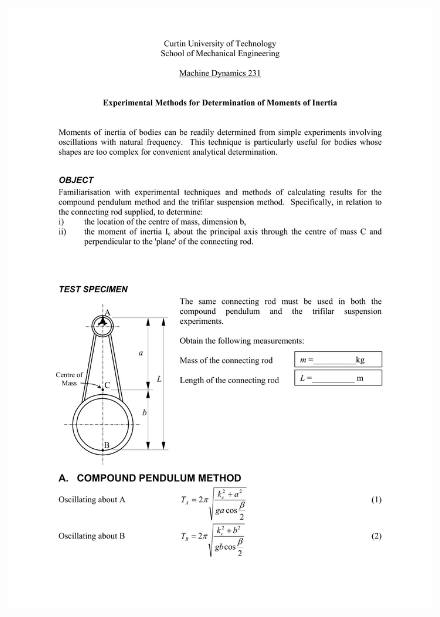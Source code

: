 \begin{figure}
  \includegraphics[width=\linewidth]{lab1/lab1-1}
  \caption*{}
\label{}
\end{figure}
